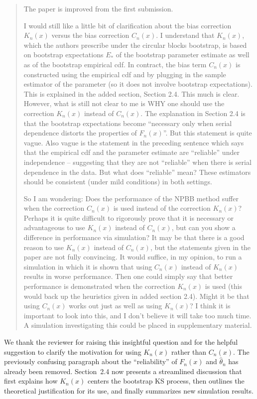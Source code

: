 \documentclass[12pt]{article}
\newenvironment{comment}%
{\begin{quotation}\noindent\small\it\color{darkblue}\ignorespaces%
}{\end{quotation}}
\begin{document}
\begin{comment}
The paper is improved from the first submission.


I would still like a little bit of clarification about the bias
correction $K_n(x)$ versus the bias correction $C_n(x)$. I understand
that $K_n(x)$, which the authors prescribe under the circular blocks
bootstrap, is based on bootstrap expectations $E_*$ of the bootstrap
parameter estimate as well as of the bootstrap empirical cdf. In
contract, the bias term $C_n(x)$ is constructed using the empirical
cdf and by plugging in the sample estimator of the parameter (so it
does not involve bootstrap expectations).  This is explained in the
added section, Section 2.4.  This much is clear. However, what is
still not clear to me is WHY one should use the correction $K_n(x)$
instead of $C_n(x)$. The explanation in Section 2.4 is that the
bootstrap expectations become ``necessary only when serial dependence
distorts the properties of $F_n(x)$''.  But this statement is quite
vague.  Also vague is the statement in the preceding sentence which
says that the empirical cdf and the parameter estimate are ``reliable''
under independence -- suggesting that they are not ``reliable'' when
there is serial dependence in the data.  But what does ``reliable''
mean? These estimators should be consistent (under mild conditions) in
both settings.


So I am wondering: Does the performance of the NPBB method suffer when
the correction $C_n(x)$ is used instead of the correction $K_n(x)$?
Perhaps it is quite difficult to rigorously prove that it is necessary
or advantageous to use $K_n(x)$ instead of $C_n(x)$, but can you show
a difference in performance via simulation?  It may be that there is a
good reason to use $K_n(x)$ instead of $C_n(x)$, but the statements
given in the paper are not fully convincing.   It would suffice, in my
opinion, to run a simulation in which it is shown that using $C_n(x)$
instead of $K_n(x)$ results in worse performance.  Then one could
simply say that better performance is demonstrated when the correction
$K_n(x)$ is used (this would back up the heuristics given in added
section 2.4). Might it be that using $C_n(x)$ works out just as well
as using $K_n(x)$?  I think it is important to look into this, and I
don't believe it will take too much time. A simulation investigating
this could be placed in supplementary material.
\end{comment}


We thank the reviewer for raising this insightful question and for the
helpful suggestion to clarify the motivation for using $K_n(x)$ rather
than $C_n(x)$.  The previously confusing paragraph about the
``reliability'' of $F_n(x)$ and $\hat\theta_n$ has already been removed.
Section~2.4 now presents a streamlined discussion that first explains how
$K_n(x)$ centers the bootstrap KS process, then outlines the theoretical
justification for its use, and finally summarizes new simulation results.
\end{document}
